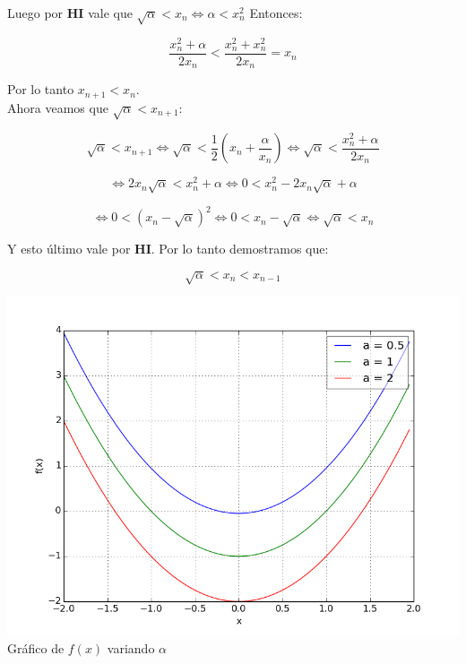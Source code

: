 Luego por {\bf HI} vale que $\sqrt{\alpha} < x_n \iff \alpha < x_n^2 $ Entonces:

\begin{displaymath}
    \frac{x_n^2 + \alpha}{2x_n} < \frac{x_n^2 + x_n^2}{2x_n} = x_n
\end{displaymath}

Por lo tanto $x_{n + 1} < x_n$.\\

Ahora veamos que $\sqrt{\alpha} < x_{n + 1}$:

\begin{displaymath}
    \sqrt{\alpha} < x_{n + 1} \iff \sqrt{\alpha} < \frac{1}{2}(x_n + \frac{\alpha}{x_n}) \iff \sqrt{\alpha} < \frac{x_n^2 + \alpha}{2x_n}
\end{displaymath}

\begin{displaymath}
    \iff 2x_n\sqrt{\alpha} < x_n^2 + \alpha \iff 0 < x_n^2 - 2x_n\sqrt{\alpha} + \alpha
\end{displaymath}

\begin{displaymath}
    \iff 0 < (x_n - \sqrt{\alpha})^2 \iff 0 < x_n - \sqrt{\alpha} \iff \sqrt{\alpha} < x_n
\end{displaymath}

Y esto último vale por {\bf HI}. Por lo tanto demostramos que:

\begin{displaymath}
    \sqrt{\alpha} < x_n < x_{n - 1}
\end{displaymath}

\begin{center}
\includegraphics[scale=0.5]{graficos/f(x).png}\\
Gráfico de $f(x)$ variando $\alpha$
\end{center}


